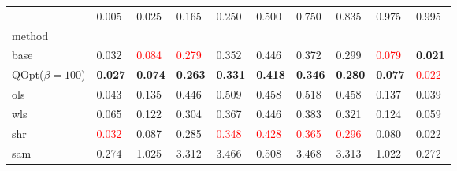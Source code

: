 \begin{tabular}{llllllllll}
\toprule
 & 0.005 & 0.025 & 0.165 & 0.250 & 0.500 & 0.750 & 0.835 & 0.975 & 0.995 \\
method &  &  &  &  &  &  &  &  &  \\
\midrule
base & 0.032 & \textcolor{red}{0.084} & \textcolor{red}{0.279} & 0.352 & 0.446 & 0.372 & 0.299 & \textcolor{red}{0.079} & \textbf{0.021} \\
\midrule
QOpt($\beta=100$) & \textbf{0.027} & \textbf{0.074} & \textbf{0.263} & \textbf{0.331} & \textbf{0.418} & \textbf{0.346} & \textbf{0.280} & \textbf{0.077} & \textcolor{red}{0.022} \\
ols & 0.043 & 0.135 & 0.446 & 0.509 & 0.458 & 0.518 & 0.458 & 0.137 & 0.039 \\
wls & 0.065 & 0.122 & 0.304 & 0.367 & 0.446 & 0.383 & 0.321 & 0.124 & 0.059 \\
shr & \textcolor{red}{0.032} & 0.087 & 0.285 & \textcolor{red}{0.348} & \textcolor{red}{0.428} & \textcolor{red}{0.365} & \textcolor{red}{0.296} & 0.080 & 0.022 \\
sam & 0.274 & 1.025 & 3.312 & 3.466 & 0.508 & 3.468 & 3.313 & 1.022 & 0.272 \\
\bottomrule
\end{tabular}